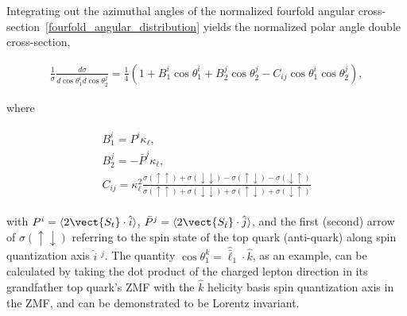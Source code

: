 Integrating out the azimuthal angles of the normalized fourfold angular cross-section~\ref{fourfold_angular_distribution} yields the normalized polar angle double cross-section,
\begin{linenomath*}
\begin{align}
\frac{1}{\sigma} \frac{d \sigma}{d \cos \theta_1^i d \cos \theta_2^j}=\frac{1}{4}\left(1+B_1^{i} \cos \theta_1^i+B_2^{j} \cos \theta_2^j-C_{ij} \cos \theta_1^i \cos \theta_2^j\right),
\label{double_angular_distribution}
\end{align}
\end{linenomath*}
\begin{center}
where 
\end{center}
\begin{linenomath*}
\begin{align}
\begin{array}{c}
B_1^{i} = P^{i}\kappa_\ell,\\
B_2^{j} = -\bar{P}^{j}\kappa_\ell,\\
C_{ij}=\kappa_{\ell}^2 \frac{\sigma(\uparrow \uparrow)+\sigma(\downarrow \downarrow)-\sigma(\uparrow \downarrow)-\sigma(\downarrow \uparrow)}{\sigma(\uparrow \uparrow)+\sigma(\downarrow \downarrow)+\sigma(\uparrow \downarrow)+\sigma(\downarrow \uparrow)}
\end{array}
\label{Polarizations_and_Spin_Correlations}
\end{align}
\end{linenomath*}
with $P^{i} = \langle 2 \vect{S_t} \cdot \hat{i} \rangle$, $\bar{P}^{j} = \langle 2 \vect{S_{\bar{t}}} \cdot \hat{j} \rangle$, and the first (second) arrow of $\sigma(\uparrow \downarrow)$ referring to the spin state of the top quark (anti-quark) along spin quantization axis $\hat{i}$ $^{j}$.
The quantity $\cos \theta_1^k = \hat{\bar{\ell}}_1 \cdot \hat{k}$, as an example, can be calculated by taking the dot product of the charged lepton direction in its grandfather top quark's ZMF with the $\hat{k}$ helicity basis spin quantization axis in the \ttbar ZMF, and can be demonstrated to be Lorentz invariant.

